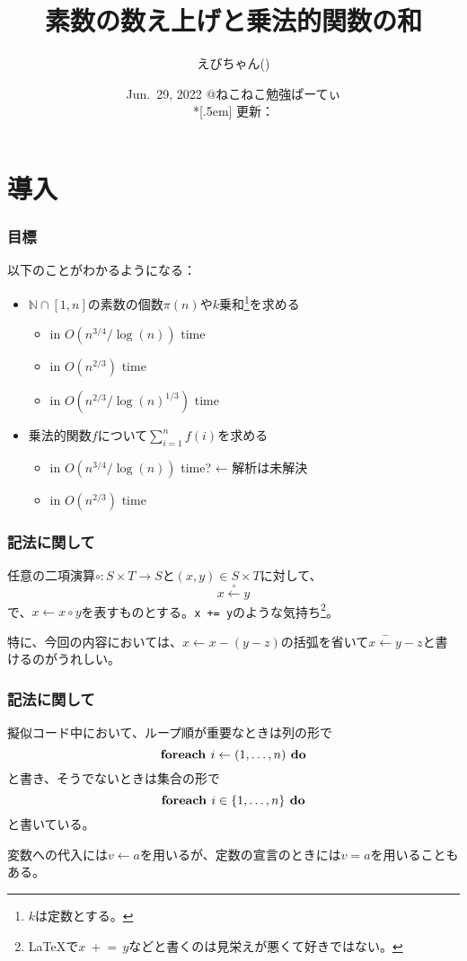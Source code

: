 \documentclass[
  lualatex,
  ja=standard,
  compress,
  hyperref={colorlinks, urlcolor=magenta, linkcolor=blue!55!black},
  dvipsnames,
  svgnames,
]{beamer}
\title{素数の数え上げと乗法的関数の和}
\author[えびちゃん]{えびちゃん(\hspace{.05em}\textcolor{useryellow}{\lato{\textbf{rsk0315}}}\hspace{.05em})}
\date{Jun.~29, 2022 @ねこねこ勉強ぱーてぃ\\*[.5em]
  {\footnotesize 更新：}\directlua{commit_hash_and_date("\\jobname.tex")}}
\newcommand{\xgets}[1]{\xleftarrow{#1}}
\begin{document}
\begin{frame}
  \maketitle
\end{frame}

\section{導入}
\begin{frame}
  \frametitle{目標}

  以下のことがわかるようになる：
  \begin{itemize}
  \item $\mathbb{N}\cap[1, n]$の素数の個数$\pi(n)$や$k$乗和\footnote{$k$は定数とする。}を求める
    \begin{itemize}
    \item in $O(n^{3/4}/\log(n))$ time
    \item in $O(n^{2/3})$ time
    \item in $O(n^{2/3} / \log(n)^{1/3})$ time
    \end{itemize}
  \item 乗法的関数$f$について$\sum_{i=1}^n f(i)$を求める
    \begin{itemize}
    \item in $O(n^{3/4}/\log(n))$ time? ← 解析は未解決
    \item in $O(n^{2/3})$ time
    \end{itemize}
  \end{itemize}
\end{frame}

\setcounter{slidetopic}{0}
\begin{frame}
  \frametitle{記法に関して \theslidetopic}

  任意の二項演算$\circ: S\times T\to S$と$(x, y)\in S\times T$に対して、
  $$ x\xgets{\circ} y $$
  で、$x\gets x\circ y$を表すものとする。\texttt{x += y}のような気持ち\footnote{\LaTeX{}で$x\:+\!\!=\,y$などと書くのは見栄えが悪くて好きではない。}。

  特に、今回の内容においては、$x \gets x - (y - z)$の括弧を省いて$x \xgets{-} y-z$と書けるのがうれしい。

\end{frame}

\begin{frame}
  \frametitle{記法に関して \theslidetopic}

  擬似コード中において、ループ順が重要なときは列の形で
  $$ \text{\textbf{foreach }}i\gets(1, \dots, n)\text{\textbf{ do}} $$
  と書き、そうでないときは集合の形で
  $$ \text{\textbf{foreach }}i\in\{1, \dots, n\}\text{\textbf{ do}} $$
  と書いている。

  変数への代入には$v \gets a$を用いるが、定数の宣言のときには$v=a$を用いることもある。
\end{frame}
\end{document}
